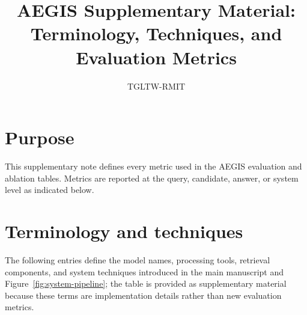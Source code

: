 \documentclass[a4paper,10pt]{article}
\title{AEGIS Supplementary Material: Terminology, Techniques, and Evaluation Metrics}
\author{TGLTW-RMIT}
\date{}
\begin{document}
\maketitle

\section*{Purpose}
This supplementary note defines every metric used in the AEGIS evaluation and ablation tables. Metrics are reported at the query, candidate, answer, or system level as indicated below.

\section*{Terminology and techniques}
The following entries define the model names, processing tools, retrieval components, and system techniques introduced in the main manuscript and Figure~\ref{fig:system-pipeline}; the table is provided as supplementary material because these terms are implementation details rather than new evaluation metrics.
\end{document}
